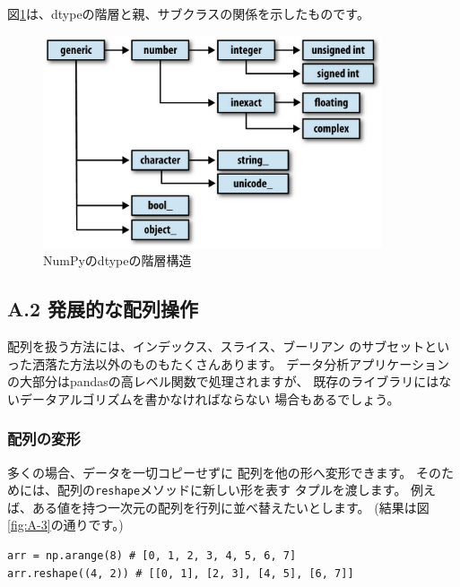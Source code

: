 \documentclass{jsarticle}
\begin{document}
            図\ref{fig:A-2}は、dtypeの階層と親、サブクラスの関係を示したものです。

            \begin{figure}[h]
                \centering
                \includegraphics[width=10cm]{images/A-2.jpg}
                \caption{NumPyのdtypeの階層構造}
                \label{fig:A-2}
            \end{figure}

    \subsection*{A.2 発展的な配列操作}
        配列を扱う方法には、インデックス、スライス、ブーリアン
        のサブセットといった洒落た方法以外のものもたくさんあります。
        データ分析アプリケーションの大部分はpandasの高レベル関数で処理されますが、
        既存のライブラリにはないデータアルゴリズムを書かなければならない
        場合もあるでしょう。

        \subsubsection*{配列の変形}
            多くの場合、データを一切コピーせずに
            配列を他の形へ変形できます。
            そのためには、配列の\verb|reshape|メソッドに新しい形を表す
            タプルを渡します。
            例えば、ある値を持つ一次元の配列を行列に並べ替えたいとします。
            (結果は図\ref{fig:A-3}の通りです。)

            \begin{lstlisting}
arr = np.arange(8) # [0, 1, 2, 3, 4, 5, 6, 7]
arr.reshape((4, 2)) # [[0, 1], [2, 3], [4, 5], [6, 7]]\end{lstlisting}
\end{document}
